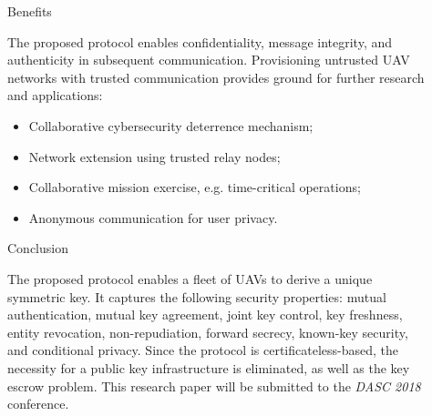 \documentclass[final]{beamer}
\newlength{\sepwid}
\newlength{\onecolwid}
\newlength{\twocolwid}
\begin{document}
\begin{frame}[t]
\begin{columns}[t]
\begin{column}{\twocolwid}
\begin{columns}[t,totalwidth=\twocolwid]
\end{columns} %

\end{column} %


\begin{column}{\sepwid}\end{column} %

\begin{column}{\onecolwid} %

\begin{alertblock}{Benefits}

The proposed protocol enables confidentiality, message integrity, and authenticity in subsequent communication. Provisioning untrusted UAV networks with trusted communication provides ground for further research and applications:
\begin{itemize}
\item Collaborative cybersecurity deterrence mechanism;
\item Network extension using trusted relay nodes;
\item Collaborative mission exercise, e.g. time-critical operations;
\item Anonymous communication for user privacy.
\end{itemize}

\end{alertblock}

\vspace*{1cm}
\begin{block}{Conclusion}

The proposed protocol enables a fleet of UAVs to derive a unique symmetric key. It captures the following security properties: mutual authentication, mutual key agreement, joint key control, key freshness, entity revocation, non-repudiation, forward secrecy, known-key security, and conditional privacy. Since the protocol is certificateless-based, the necessity for a public key infrastructure is eliminated, as well as the key escrow problem. This research paper will be submitted to the {\em DASC 2018} conference.


\end{block}
\end{column}
\end{columns}
\end{frame}
\end{document}
